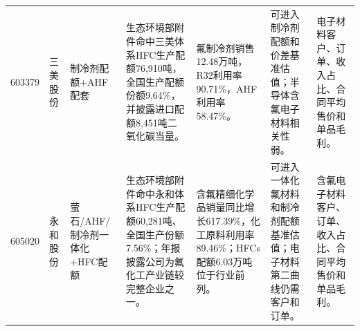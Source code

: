 \begin{exhibitbox}[上游资源安全与基准现金流证据]
\begin{tabularx}{\exhibitboxwidth}{L{0.85cm} L{1.15cm} L{1.65cm} X X X X}
603379 & 三美股份 & 制冷剂配额+AHF配套 & 生态环境部附件命中三美体系HFC生产配额76,910吨，全国生产配额份额9.64\%，并披露进口配额8,451吨二氧化碳当量。 & 氟制冷剂销售12.48万吨，R32利用率90.71\%，AHF利用率58.47\%。 & 可进入制冷剂配额和价差基准估值；半导体含氟电子材料相关性弱。 & 电子材料客户、订单、收入占比、合同平均售价和单品毛利。 \\
605020 & 永和股份 & 萤石/AHF/制冷剂一体化+HFC配额 & 生态环境部附件命中永和体系HFC生产配额60,281吨、全国生产份额7.56\%；年报披露公司为氟化工产业链较完整企业之一。 & 含氟精细化学品销量同比增长617.39\%，化工原料利用率89.46\%；HFCs配额6.03万吨位于行业前列。 & 可进入一体化氟材料和制冷剂配额基准估值；电子材料第二曲线仍需客户和订单。 & 含氟电子材料客户、订单、收入占比、合同平均售价和单品毛利。 \\
\bottomrule
\end{tabularx}
\end{exhibitbox}

